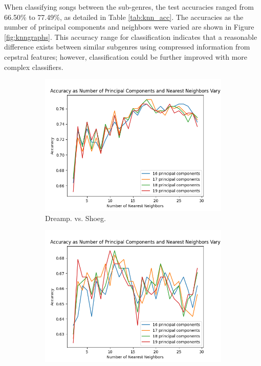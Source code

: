 \documentclass[letterpaper, 12 pt, conference]{ieeeconf}  %
\begin{document}
\par When classifying songs between the sub-genres, the test accuracies ranged from 66.50\% to 77.49\%, as detailed in Table \ref{tab:knn_acc}. The accuracies as the number of principal components and neighbors were varied are shown in Figure \ref{fig:knngraphs}. 
This accuracy range for classification indicates that a reasonable difference exists between similar subgenres using compressed information from cepstral features; however, classification could be further improved with more complex classifiers. 

\begin{figure}[!hb] 
  \begin{subfigure}{.23\textwidth}
    \centering
    \includegraphics[width=.8\linewidth]{knnplot_dpsg.png}
    \caption{Dreamp. vs. Shoeg.}
    \label{fig:knngraph1}
  \end{subfigure}
  \begin{subfigure}{.23\textwidth}
    \centering
    \includegraphics[width=.8\linewidth]{knnplot_mrpr.png}

\end{subfigure}
\end{figure}
\end{document}
